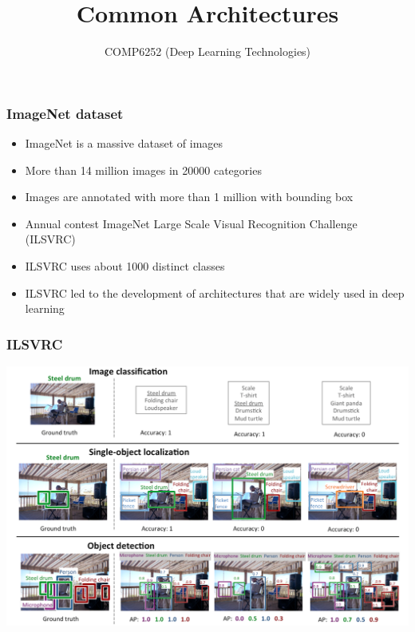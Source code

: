 \documentclass{beamer}
\begin{document}
\title{Common Architectures}
\author{COMP6252 (Deep Learning Technologies)}
 \date{}
 
\begin{frame}
    \placelogofalse %
    \titlepage
\end{frame}
    
\placelogotrue

\begin{frame}
    \frametitle{ImageNet dataset}
\begin{itemize}
    \item ImageNet is a massive dataset of images
    \item More than 14 million images in 20000 categories 
    \item Images are annotated with more than 1 million with bounding box
    \item Annual contest ImageNet Large Scale Visual Recognition Challenge (ILSVRC)
    \item ILSVRC uses about 1000 distinct classes
    \item ILSVRC led to the development of architectures that are widely used in deep learning
\end{itemize}
    
\end{frame}
\begin{frame}
    \frametitle{ILSVRC}
    \begin{center}
        \includegraphics[width=\textwidth]{figs/ILSVRC.png}
    \end{center}
\end{frame}
\end{document}
